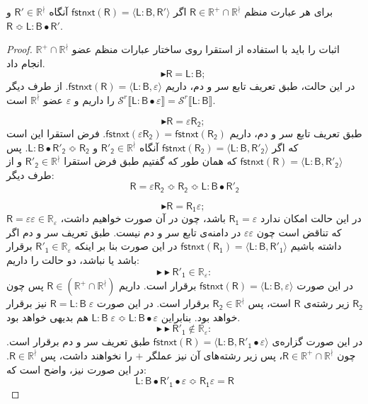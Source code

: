 \begin{thm}
	برای هر عبارت منظم 
	$\mathsf{R} \in \mathbb{R^+ \cap R^\nmid}$
	اگر 
	$\mathsf{fstnxt(R)=\langle L:B , R'\rangle}$
		آنگاه 
	$\mathsf{R'}\in \mathbb{R}^\nmid$
	و 
	$\mathsf{R \Bumpeq L:B\bullet R'}$.
\end{thm}
\begin{proof}
	اثبات را باید با استفاده از استقرا روی ساختار عبارات منظم عضو 
	$\mathbb{R^+ \cap R^\nmid}$
	انجام داد.
	$$\blacktriangleright\mathsf{R=L:B;\:}$$
	در این حالت، طبق تعریف تابع سر و دم، داریم
	$\mathsf{fstnxt(R)=\langle L:B , \varepsilon \rangle}$.
	از طرف دیگر \break
	$\mathcal{S}^r\llbracket \mathsf{L:B \bullet \varepsilon} \rrbracket = 
	\mathcal{S}^r \llbracket \mathsf{L:B} \rrbracket$
	را داریم و $\varepsilon$ عضو $\mathbb{R^\nmid}$ است.
	
	$$\blacktriangleright\mathsf{R=\varepsilon R_2;\:}$$
	طبق تعریف تابع سر و دم، داریم
	$\mathsf{fstnxt(\varepsilon R_2) = fstnxt(R_2)}$.
		فرض استقرا این است که اگر 
		$\mathsf{fstnxt(R_2)=\langle L:B, R'_2 \rangle}$
	آنگاه 
	$\mathsf{R'_2}\in \mathbb{R^\nmid}$
	و
	$\mathsf{L:B \bullet R'_2} \Bumpeq  \mathsf{R_2}$.
	پس 
	$\mathsf{fstnxt(R)=\langle L:B , R'_2 \rangle}$
	که همان‌ طور که گفتیم طبق فرض استقرا 
	$\mathsf{R'_2} \in \mathbb{R^\nmid}$
	و از طرف دیگر:
	$$\mathsf{R=\varepsilon R_2 \Bumpeq R_2 \Bumpeq L:B \bullet R'_2 }$$
			
	
	
	
	
	
	$$\blacktriangleright\mathsf{R=R_1 \varepsilon;\:}$$
	در این حالت امکان ندارد $\mathsf{R_1=\varepsilon}$ باشد، چون در آن صورت خواهیم داشت، 
	$\mathsf{R=\varepsilon \varepsilon} \in \mathbb{R_\varepsilon}$
	که تناقض است چون $\varepsilon \varepsilon$ در دامنه‌ی تابع سر و دم نیست.
	طبق تعریف سر و دم اگر داشته باشیم 
	$\mathsf {fstnxt(R_1)=\langle L:B , R'_1 \rangle}$
در این صورت بنا بر اینکه 
$\mathsf{R'_1} \in \mathbb{R_\varepsilon}$
برقرار باشد یا نباشد، دو حالت را داریم:
	$$\blacktriangleright\blacktriangleright \mathsf{R'_1} \in \mathbb{R_\varepsilon}: $$
	در این صورت 
	$\mathsf{fstnxt(R)=\langle L:B , \varepsilon \rangle}$
برقرار است. داریم
 $\mathsf{R} \in \mathbb{( \mathbb{R^+ \cap R^\nmid})}$
  پس 
  چون
  $\mathsf{R_2}$
  زیر رشته‌ی $\mathsf{R}$ است، پس
  $\mathsf{R_2 \in} \mathbb{R^\nmid}$
  برقرار است. در این صورت $\mathsf{R=L:B\;\varepsilon}$ نیز برقرار خواهد بود. بنابراین
  $\mathsf{L:B\;\varepsilon \Bumpeq L:B \bullet \varepsilon}$
  هم بدیهی خواهد بود.
  $$\blacktriangleright\blacktriangleright \mathsf{R'_1} \notin \mathbb{R_\varepsilon}: $$
در این صورت گزاره‌ی 
$\mathsf{fstnxt(R)=\langle L:B , R'_1 \bullet \varepsilon \rangle}$
طبق تعریف سر و دم برقرار است. چون 
$\mathsf{R} \in \mathbb{R^+ \cap R^\nmid}$،
پس زیر رشته‌های آن نیز عملگر $+$ را نخواهند داشت، پس 
$\mathsf{R} \in \mathbb{R^\nmid}$.
در این صورت نیز، واضح است که:
$$\mathsf{L:B \bullet R'_1 \bullet \varepsilon \Bumpeq R_1 \varepsilon = R }$$



\end{proof}
